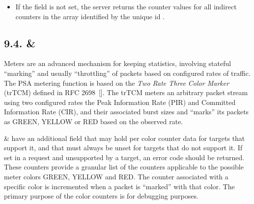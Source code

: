 \documentclass[11pt]{article}
\begin{document}
{\begin{itemize}
\item{}
If the  field is not set, the server returns the counter values for all
indirect counters in the array identified by the unique id .%
\end{itemize}%

\subsection{9.4.\hspace*{0.5em} \& }\label{sec-meterentry-directmeterentry}%

\noindent{}Meters are an advanced mechanism for keeping statistics, involving stateful
\textquotedblleft{}marking\textquotedblright{} and usually \textquotedblleft{}throttling\textquotedblright{} of packets based on configured rates of
traffic. The PSA metering function is based on the \emph{Two Rate Three Color Marker}
(trTCM) defined in RFC 2698~[]. The trTCM meters an arbitrary packet
stream using two configured rates \textemdash{} the Peak Information Rate (PIR) and
Committed Information Rate (CIR), and their associated burst sizes \textemdash{} and
\textquotedblleft{}marks\textquotedblright{} its packets as GREEN, YELLOW or RED based on the observed rate.%

 \&  have an additional field  that
may hold per color counter data for targets that support it, and that must
always be unset for targets that do not support it. If set in a request and
unsupported by a target, an  error code should be returned.
These counters provide a granular list of the counters applicable to the
possible meter colors GREEN, YELLOW and RED. The counter associated with a
specific color is incremented when a packet is \textquotedblleft{}marked\textquotedblright{} with that color. The
primary purpose of the color counters is for debugging purposes.%

}
\end{document}
